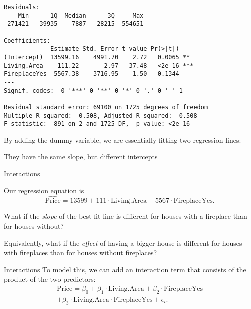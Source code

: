 \documentclass{beamer}\usepackage[]{graphicx}\usepackage[]{color}
\makeatletter
\newenvironment{kframe}{%
 \def\at@end@of@kframe{}%
 \ifinner\ifhmode%
  \def\at@end@of@kframe{\end{minipage}}%
  \begin{minipage}{\columnwidth}%
 \fi\fi%
 \def\FrameCommand##1{\hskip\@totalleftmargin \hskip-\fboxsep
 \colorbox{shadecolor}{##1}\hskip-\fboxsep
     \hskip-\linewidth \hskip-\@totalleftmargin \hskip\columnwidth}%
 \MakeFramed {\advance\hsize-\width
   \@totalleftmargin\z@ \linewidth\hsize
   \@setminipage}}%
 {\par\unskip\endMakeFramed%
 \at@end@of@kframe}
\newenvironment{knitrout}{}{} %
\makeatother
\begin{document}
\begin{darkframes}
\begin{frame}[fragile]
\begin{knitrout}
\begin{kframe}
\begin{verbatim}
Residuals:
    Min      1Q  Median      3Q     Max 
-271421  -39935   -7887   28215  554651 

Coefficients:
             Estimate Std. Error t value Pr(>|t|)    
(Intercept)  13599.16    4991.70    2.72   0.0065 ** 
Living.Area    111.22       2.97   37.48   <2e-16 ***
FireplaceYes  5567.38    3716.95    1.50   0.1344    
---
Signif. codes:  0 '***' 0 '**' 0 '*' 0 '.' 0 ' ' 1

Residual standard error: 69100 on 1725 degrees of freedom
Multiple R-squared:  0.508,	Adjusted R-squared:  0.508 
F-statistic:  891 on 2 and 1725 DF,  p-value: <2e-16
\end{verbatim}
\end{kframe}
\end{knitrout}
    \end{frame}

    \begin{frame}
      By adding the dummy variable, we are essentially fitting two regression lines:
\begin{knitrout}


\end{knitrout}
    They have the same slope, but different intercepts
    \end{frame}

    \begin{frame}{Interactions}
      \begin{center}
        Our regression equation is
        \[
          \widehat{\text{Price}} = 13599
            + 111 \cdot\text{Living.Area}
            + 5567 \cdot\text{FireplaceYes}.
        \]

        \bigskip\pause

        What if the \emph{slope} of the best-fit line is different for houses with a fireplace than for houses without?

        \bigskip\pause

        Equivalently, what if the \emph{effect} of having a bigger house is different for houses with fireplaces than for houses without fireplaces?
      \end{center}
    \end{frame}

    \begin{frame}{Interactions}
      To model this, we can add an \alert{interaction term} that consists of the product of the two predictors:
      \begin{multline*}
        \text{Price} = \beta_0 + \beta_1\cdot\text{Living.Area} + \beta_2\cdot\text{FireplaceYes}
        \\ + \beta_3\cdot\text{Living.Area}\cdot\text{FireplaceYes} + \epsilon_i.
      \end{multline*}


\end{frame}
\end{darkframes}
\end{document}

